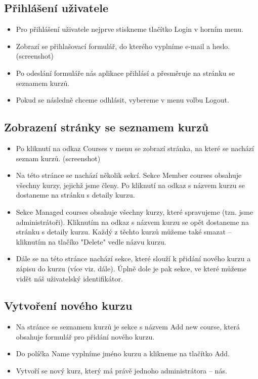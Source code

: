 \subsection{Přihlášení uživatele}

\begin{itemize}
	\item Pro přihlášení uživatele nejprve stiskneme tlačítko Login v horním menu.
	\item Zobrazí se přihlašovací formulář, do kterého vyplníme e-mail a heslo. (screenshot)
	\item Po odeslání formuláře nás aplikace přihlásí a přesměruje na stránku se seznamem kurzů.
	\item Pokud se následně chceme odhlásit, vybereme v menu volbu Logout.
\end{itemize}

\subsection{Zobrazení stránky se seznamem kurzů}

\begin{itemize}
	\item Po kliknutí na odkaz Courses v menu se zobrazí stránka, na které se nachází seznam kurzů. (screenshot)
	\item Na této stránce se nachází několik sekcí. Sekce Member courses obsahuje všechny kurzy, jejichž jsme členy. Po kliknutí na odkaz s názvem kurzu se dostaneme na stránku s detaily kurzu.
	\item Sekce Managed courses obsahuje všechny kurzy, které spravujeme (tzn. jsme administrátoři). Kliknutím na odkaz s názvem kurzu se opět dostaneme na stránku s detaily kurzu. Každý z těchto kurzů můžeme také smazat -- kliknutím na tlačíko "Delete" vedle názvu kurzu.
	\item Dále se na této stránce nachází sekce, které slouží k přidání nového kurzu a zápisu do kurzu (více viz. dále). Úplně dole je pak sekce, ve které můžeme vidět náš uživatelský identifikátor.
\end{itemize}

\subsection{Vytvoření nového kurzu}

\begin{itemize}
	\item Na stránce se seznamem kurzů je sekce s názvem Add new course, která obsahuje formulář pro přidání nového kurzu.
	\item Do políčka Name vyplníme jméno kurzu a klikneme na tlačítko Add.
	\item Vytvoří se nový kurz, který má právě jednoho administrátora -- nás.
\end{itemize}

